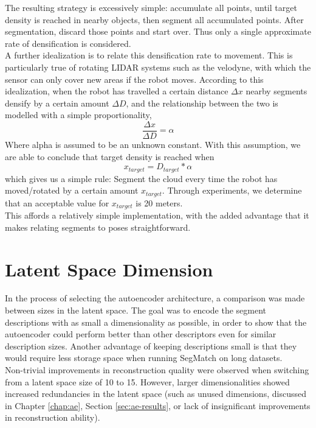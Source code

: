 The resulting strategy is excessively simple: accumulate all points, until target density is reached in nearby objects, then segment all accumulated points. After segmentation, discard those points and start over. Thus only a single approximate rate of densification is considered.\\

A further idealization is to relate this densification rate to movement. This is particularly true of rotating LIDAR systems such as the velodyne, with which the sensor can only cover new areas if the robot moves.  
According to this idealization, when the robot has travelled a certain distance $\Delta x$ nearby segments densify by a certain amount $\Delta D$, and the relationship between the two is modelled with a simple proportionality,
$$\frac{\Delta x}{\Delta D} = \alpha$$
Where alpha is assumed to be an unknown constant. With this assumption, we are able to conclude that target density is reached when
$$x_{target} = D_{target} * \alpha$$
which gives us a simple rule: Segment the cloud every time the robot has moved/rotated by a certain amount $x_{target}$. Through experiments, we determine that an acceptable value for $x_{target}$ is 20 meters.\\

This affords a relatively simple implementation, with the added advantage that it makes relating segments to poses straightforward.\\



\section{Latent Space Dimension}
\label{sec:latent_space_size}

In the process of selecting the autoencoder architecture, a comparison was made between sizes in the latent space. The goal was to encode the segment descriptions with as small a dimensionality as possible, in order to show that the autoencoder could perform better than other descriptors even for similar description sizes. Another advantage of keeping descriptions small is that they would require less storage space when running SegMatch on long datasets.\\

Non-trivial improvements in reconstruction quality were observed when switching from a latent space size of 10 to 15. However, larger dimensionalities showed increased redundancies in the latent space (such as unused dimensions, discussed in Chapter \ref{chap:ae}, Section \ref{sec:ae-results}, or lack of insignificant improvements in reconstruction ability).\\

